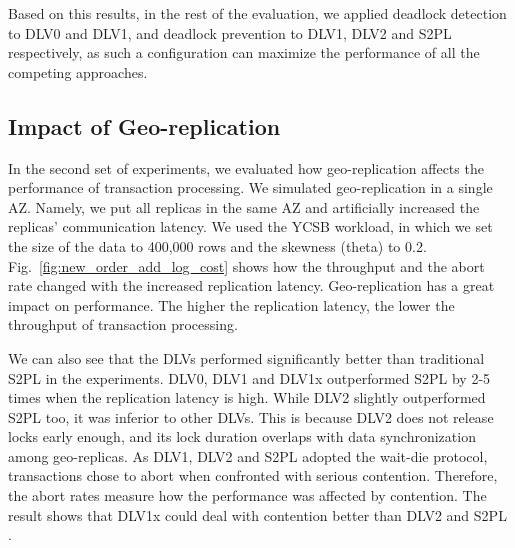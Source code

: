 \documentclass[conference]{IEEEtran}
\begin{document}
Based on this results, in the rest of the evaluation, we applied deadlock detection to DLV0 and DLV1, and deadlock prevention to DLV1, DLV2 and S2PL respectively,
as such a configuration can maximize the performance of all the competing approaches.


\subsection{Impact of Geo-replication}

In the second set of experiments, we evaluated how geo-replication affects the performance of transaction processing.
We simulated geo-replication in a single AZ.
Namely, we put all replicas in the same AZ and artificially increased the replicas' communication latency.
We used the YCSB workload, in which we set the size of the data to 400,000 rows and the skewness (theta) to 0.2.
Fig.~\ref{fig:new_order_add_log_cost} shows how the throughput and the abort rate changed with the increased replication latency.
Geo-replication has a great impact on performance. The higher the replication latency, the lower the throughput of transaction processing.

We can also see that the DLVs performed significantly better than traditional S2PL in the experiments.
DLV0, DLV1 and DLV1x outperformed S2PL by 2-5 times when the replication latency is high.
While DLV2 slightly outperformed S2PL too, it was inferior to other DLVs.
This is because DLV2 does not release locks early enough, and its lock duration overlaps with data synchronization among geo-replicas.
As DLV1, DLV2 and S2PL adopted the wait-die protocol, transactions chose to abort when confronted with serious contention.
Therefore, the abort rates measure how the performance was affected by contention.
The result shows that DLV1x could deal with contention better than DLV2 and S2PL .
\end{document}
